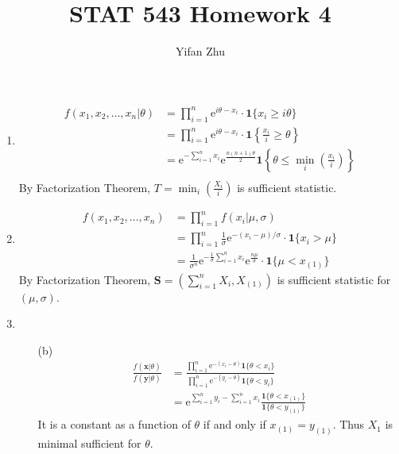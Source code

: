 \documentclass{article}
\begin{document}
\setcounter{MaxMatrixCols}{20}



\title{STAT 543 Homework 4}
\author{Yifan Zhu}
\maketitle

\begin{enumerate}[leftmargin = 0 em, label = \arabic*., font = \bfseries]
	\item
	      \begin{align*}
		      f(x_1 , x_2, \ldots , x_n | \theta ) & = \prod_{i=1}^{n} \mathrm{e}^{i \theta - x_i} \cdot \bm 1 \{x_i \geq i \theta\}                                                         \\
		                                           & = \prod_{i=1}^{n} \mathrm{e}^{i \theta - x_i} \cdot \bm 1 \left\{\frac{x_i}{i} \geq \theta\right\}                                      \\
		                                           & = \mathrm{e}^{-\sum_{i=1}^n x_i} \mathrm{e}^{\frac{n(n+1)\theta}{2}} \bm 1 \left\{\theta \leq \min_i \left(\frac{x_i}{i}\right)\right\} \\
	      \end{align*}
	      By Factorization Theorem, $T = \min_{i}\left(\frac{X_i}{i}\right)$ is sufficient statistic.

	\item
	      \begin{align*}
		      f(x_1, x_2, \ldots, x_n) & = \prod_{i=1}^{n}f(x_i | \mu , \sigma)                                                                                               \\
		                               & = \prod_{i=1}^{n}\frac{1}{\sigma} \mathrm{e}^{-(x_i - \mu)/\sigma} \cdot \bm 1 \{x_i > \mu\}                                         \\
		                               & = \frac{1}{\sigma^n} \mathrm{e}^{-\frac{1}{\sigma} \sum_{i=1}^n x_i} \mathrm{e}^{\frac{n \mu}{\sigma}} \cdot \bm 1 \{\mu < x_{(1)}\}
	      \end{align*}
	      By Factorization Theorem, $\bm S = (\sum_{i=1}^n X_i, X_{(1)})$ is sufficient statistic for $(\mu,\sigma)$.


	\item
	      \begin{itemize}
		      \item [(b)]
		            \begin{align*}
			            \frac{f(\bm x | \theta)}{f(\bm y | \theta)} & = \frac{\prod_{i=1}^{n} \mathrm{e}^{-(x_i - \theta)} \bm 1 \{\theta < x_i\}}{\prod_{i=1}^{n} \mathrm{e}^{-(y_i - \theta)} \bm 1 \{\theta < y_i\}} \\
			                                                        & = \mathrm{e}^{\sum_{i=1}^n y_i - \sum_{i=1}^n x_i} \frac{\bm 1 \{\theta < x_{(1)}\}}{\bm 1 \{\theta < y_{(1)}\}}
		            \end{align*}
		            It is a constant as a function of $\theta$ if and only if $x_{(1)} = y_{(1)}$. Thus $X_{1}$ is minimal sufficient for $\theta$.


\end{itemize}
\end{enumerate}
\end{document}
